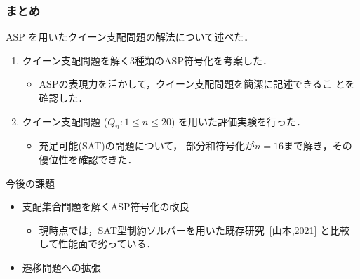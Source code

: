 \documentclass[dvipdfmx,10pt]{beamer}
\begin{document}
%
%

\begin{frame}\frametitle{まとめ}

  \begin{block}{}\centering
    ASP を用いたクイーン支配問題の解法について述べた．
  \end{block}
  \vfill
  \begin{enumerate}
  \item クイーン支配問題を解く3種類のASP符号化を考案した．
    \begin{itemize}
    \item ASPの表現力を活かして，クイーン支配問題を簡潔に記述できるこ
      とを確認した．
    \end{itemize}
  \item クイーン支配問題 ($Q_{n}: 1\leq n\leq 20$) を用いた評価実験を行った．
    \begin{itemize}
    \item 充足可能(\textsf{SAT})の問題について，
      部分和符号化が$n=16$まで解き，その優位性を確認できた．
    \end{itemize}
  \end{enumerate}
  \vfill
  \begin{block}{今後の課題}
    \begin{itemize}
    \item 支配集合問題を解くASP符号化の改良
      \begin{itemize}
      \item 現時点では，SAT型制約ソルバーを用いた既存研究~[山本,2021]
        と比較して性能面で劣っている．
      \end{itemize}
    \item 遷移問題への拡張
    \end{itemize}
  \end{block}
\end{frame}

%
%


\end{document}

